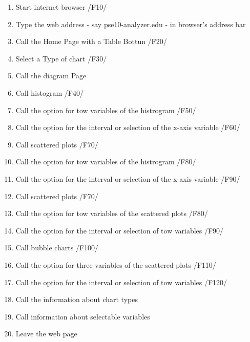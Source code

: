 \begin{enumerate}


\item Start internet browser /F10/

\item Type the web address - say pse10-analyzer.edu - in browser's address bar

\item Call the Home Page with a Table Bottun /F20/ %

\item Select a Type of chart /F30/

\item Call the diagram Page 

\item Call histogram /F40/

\item Call the option for tow variables of the histrogram /F50/

\item Call the option for the interval or selection of the x-axis variable /F60/

\item Call  scattered plots  /F70/

\item Call the option for tow variables of the histrogram /F80/

\item Call the option for the interval or selection of the x-axis variable /F90/

\item Call  scattered plots  /F70/

\item Call the option for tow variables of the scattered plots /F80/

\item Call the option for the interval or selection of tow variables /F90/

\item Call bubble charts /F100/

\item Call the option for three variables of the scattered plots /F110/

\item Call the option for the interval or selection of tow variables /F120/

\item Call the information about chart types

\item Call information about selectable variables

\item Leave the web page

\end{enumerate}
